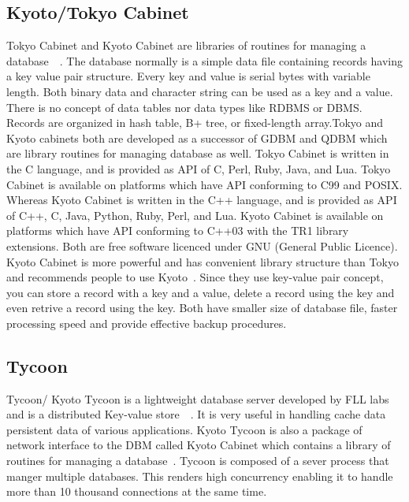      \pv

\subsection{Kyoto/Tokyo Cabinet \cv}

Tokyo Cabinet and Kyoto Cabinet are libraries of routines for managing
a database~\cite{www-tokyo-cabinet}~\cite{www-kyoto-cabinet}.  The
database normally is a simple data file containing records having a
key value pair structure. Every key and value is serial bytes with
variable length. Both binary data and character string can be used as
a key and a value. There is no concept of data tables nor data types
like RDBMS or DBMS. Records are organized in hash table, B+ tree, or
fixed-length array.Tokyo and Kyoto cabinets both are developed as a
successor of GDBM and QDBM which are library routines for managing
database as well. Tokyo Cabinet is written in the C language, and is
provided as API of C, Perl, Ruby, Java, and Lua. Tokyo Cabinet is
available on platforms which have API conforming to C99 and
POSIX. Whereas Kyoto Cabinet is written in the C++ language, and is
provided as API of C++, C, Java, Python, Ruby, Perl, and Lua. Kyoto
Cabinet is available on platforms which have API conforming to C++03
with the TR1 library extensions. Both are free software licenced under
GNU (General Public Licence). Kyoto Cabinet is more powerful and has
convenient library structure than Tokyo and recommends people to use
Kyoto~\cite{www-tokyo-cabinet}. Since they use key-value pair concept,
you can store a record with a key and a value, delete a record using
the key and even retrive a record using the key. Both have smaller
size of database file, faster processing speed and provide effective
backup procedures.

     \pv

     
\subsection{Tycoon}

Tycoon/ Kyoto Tycoon is a lightweight database server developed by FLL
labs and is a distributed Key-value
store~\cite{www-cloufare-tycoon}~\cite{www-fallabs-tycoon}.  It is
very useful in handling cache data persistent data of various
applications. Kyoto Tycoon is also a package of network interface to
the DBM called Kyoto Cabinet which contains a library of routines for
managing a database~\cite{www-fallabs-kyoto}. Tycoon is composed of a
sever process that manger multiple databases. This renders high
concurrency enabling it to handle more than 10 thousand connections at
the same time.

